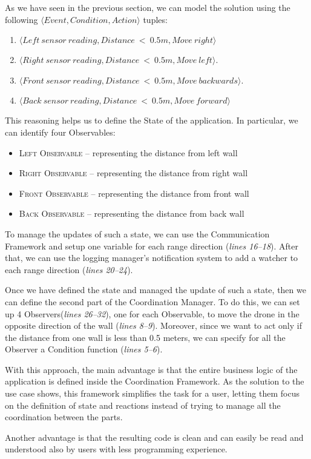 As we have seen in the previous section, we can model the solution using the following \( \langle Event, Condition, Action \rangle \) tuples:
\begin{enumerate}
    \item \( \langle Left~sensor~reading, Distance~<~0.5m, Move~right \rangle \)
    \item \( \langle Right~sensor~reading, Distance~<~0.5m, Move~left \rangle \).
    \item \( \langle Front~sensor~reading, Distance~<~0.5m, Move~backwards \rangle \).
    \item \( \langle Back~sensor~reading, Distance~<~0.5m, Move~forward \rangle \)
\end{enumerate}

This reasoning helps us to define the State of the application. 
In particular, we can identify four Observables:
\begin{itemize}
    \item \textsc{Left Observable} -- representing the distance from left wall
    \item \textsc{Right Observable} -- representing the distance from right wall
    \item \textsc{Front Observable} -- representing the distance from front wall
    \item \textsc{Back Observable} -- representing the distance from back wall
\end{itemize}

To manage the updates of such a state, we can use the Communication Framework and setup one variable for each range direction (\textit{lines 16--18}).
After that, we can use the logging manager's notification system to add a watcher to each range direction (\textit{lines 20--24}).

Once we have defined the state and managed the update of such a state, then we can define the second part of the Coordination Manager.
To do this, we can set up 4 Observers(\textit{lines 26--32}), one for each Observable, to move the drone in the opposite direction of the wall (\textit{lines 8--9}).
Moreover, since we want to act only if the distance from one wall is less than 0.5 meters, we can specify for all the Observer a Condition function (\textit{lines 5--6}).


With this approach, the main advantage is that the entire business logic of the application is defined inside the Coordination Framework.
As the solution to the use case shows, this framework simplifies the task for a user, letting them focus on the definition of state and reactions instead of trying to manage all the coordination between the parts. 

Another advantage is that the resulting code is clean and can easily be read and understood also by users with less programming experience.
